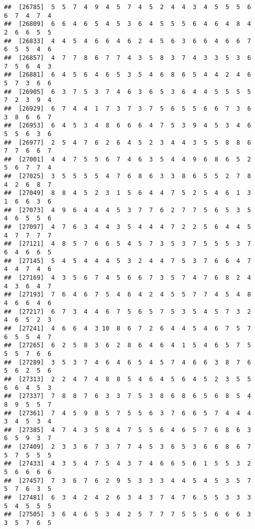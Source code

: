 \documentclass[
]{book}
\begin{document}
\begin{verbatim}
##  [26785]  5  5  7  4  9  4  5  7  4  5  2  4  4  3  4  5  5  5  6  6  7  4  7  4
##  [26809]  6  6  4  6  5  4  5  3  6  4  5  5  5  6  4  6  4  8  4  2  6  6  5  5
##  [26833]  4  4  5  4  6  6  4  6  2  4  5  6  3  6  6  4  6  6  7  6  5  5  4  6
##  [26857]  4  7  7  8  6  7  7  4  3  5  8  3  7  4  3  3  5  3  6  7  5  6  4  3
##  [26881]  6  4  5  6  4  6  5  3  5  4  6  8  6  5  4  4  2  4  6  5  7  3  6  6
##  [26905]  6  3  7  5  3  7  4  6  3  6  5  3  6  4  4  5  5  5  5  7  2  3  9  4
##  [26929]  6  7  4  4  1  7  3  7  3  7  5  6  5  5  6  6  7  3  6  3  8  6  6  7
##  [26953]  6  4  5  3  4  8  6  6  6  4  7  5  3  9  4  5  3  4  6  5  5  6  3  6
##  [26977]  2  5  4  7  6  2  6  4  5  2  3  4  4  3  5  5  8  8  6  7  7  6  6  7
##  [27001]  4  4  7  5  5  6  7  4  6  3  5  4  4  9  6  8  6  5  2  5  6  7  7  4
##  [27025]  3  5  5  5  5  4  7  6  8  6  3  3  8  6  5  5  2  7  8  4  2  6  8  7
##  [27049]  8  8  4  5  2  3  1  5  6  4  4  7  5  2  5  4  6  1  3  1  6  6  3  6
##  [27073]  4  9  6  4  4  4  5  3  7  7  6  2  7  7  5  6  5  3  5  4  6  5  5  6
##  [27097]  4  7  6  3  4  4  3  5  4  4  4  7  2  2  5  6  4  4  5  4  7  7  7  7
##  [27121]  4  8  5  7  6  6  5  4  5  7  3  5  3  7  5  5  5  3  7  6  4  6  6  5
##  [27145]  5  4  5  4  4  4  5  3  2  4  4  7  5  3  7  6  6  4  7  4  4  7  4  6
##  [27169]  4  3  5  6  7  4  5  6  6  7  3  5  7  4  7  6  8  2  4  4  3  6  4  7
##  [27193]  7  6  4  6  7  5  4  6  4  2  4  5  5  7  7  4  5  4  8  4  6  6  4  6
##  [27217]  6  7  3  4  4  6  7  5  6  5  7  5  3  5  4  5  7  3  2  4  6  5  2  3
##  [27241]  4  6  6  4  3 10  8  6  7  2  6  4  4  5  4  6  7  5  7  6  5  5  4  7
##  [27265]  6  2  5  8  3  6  2  8  6  4  6  4  1  5  4  6  5  7  5  5  5  7  6  6
##  [27289]  3  5  3  7  4  6  4  6  5  4  5  7  4  6  6  3  8  7  6  5  6  2  5  6
##  [27313]  2  2  4  7  4  8  8  5  4  6  4  5  6  4  5  2  3  5  5  6  6  4  5  3
##  [27337]  7  8  8  7  6  3  3  7  5  3  8  6  8  6  5  6  8  5  4  8  9  5  5  7
##  [27361]  7  4  5  9  8  5  7  5  5  6  3  7  6  6  5  7  4  4  4  3  4  5  3  4
##  [27385]  4  7  4  3  5  8  4  7  5  5  6  4  6  5  7  6  8  6  3  6  5  9  3  7
##  [27409]  2  3  3  6  7  3  7  7  4  5  3  6  5  3  6  6  8  6  7  5  7  5  5  5
##  [27433]  4  3  5  4  7  5  4  3  7  4  6  6  5  6  1  5  5  3  2  5  6  6  6  6
##  [27457]  7  3  6  7  6  2  9  5  3  3  3  4  4  5  4  5  3  5  7  5  7  6  3  5
##  [27481]  6  3  4  2  4  2  6  3  4  3  7  4  7  6  5  5  3  3  3  5  4  5  5  5
##  [27505]  3  6  4  6  5  3  4  2  5  7  7  7  5  5  5  6  6  6  3  3  5  7  6  5

\end{verbatim}
\end{document}
